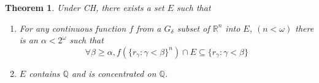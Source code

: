 \documentclass[11pt]{amsart}
\newtheorem{theorem}{Theorem}[section]
\newtheorem{lemma}[theorem]{Lemma}
\theoremstyle{definition}
\theoremstyle{remark}
\newcommand{\R}{\mathbb{R}}
\newcommand{\Q}{\mathbb{Q}}
\theoremstyle{plain}
\begin{document}
\begin{theorem}\label{setE}
    Under CH, there exists a set $E$ such that 
    \begin{enumerate}
        \item For any continuous function $f$ from a $G_\delta$ subset of ${\mathbb R}^n$ into $E$, $(n<\omega)$ there is an $\alpha<2^\omega$ such that
        \[
        \forall \beta\geq \alpha, f(\{r_\gamma:\gamma<\beta\}^n) \cap E \subseteq \{r_\gamma:\gamma<\beta\}
        \]
        \item $E$ contains $\Q$ and is concentrated on ${\mathbb Q}$. 
    \end{enumerate}
\end{theorem}
\end{document}

